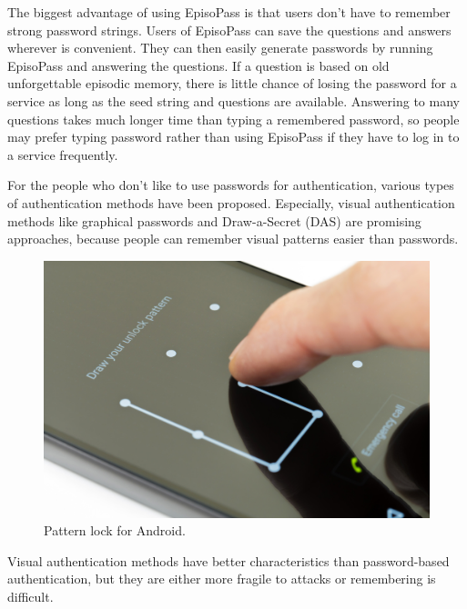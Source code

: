 \documentclass[sigconf]{acmart}
\begin{document}
The biggest advantage of using EpisoPass is that
users don't have to remember strong password strings.
%
Users of EpisoPass can save the questions and answers
wherever is convenient. They can
then easily generate passwords by running
EpisoPass and answering the questions.
%
If a question is based on old unforgettable episodic memory,
there is little chance of losing the password for a service
as long as the seed string and questions are available.
%
Answering to many questions takes much longer time than typing a
remembered password, so people may prefer typing password
rather than using EpisoPass if they have to log in to a service frequently.


For the people who don't like to use passwords for authentication,
various types of authentication methods have been proposed.
Especially, visual authentication methods
like graphical passwords\cite{Biddle:2012:GPL:2333112.2333114,GraphicalPasswords}
and Draw-a-Secret (DAS) \cite{DAS} are promising approaches, because
people can remember visual patterns easier than passwords.


\begin{figure}
  \includegraphics[width=12cm,bb=0 0 1000 667]{figures/AndroidLock.jpg}
  \caption{Pattern lock for Android.}
  \label{AndroidLock}
\end{figure}

Visual authentication methods have better characteristics than
password-based authentication, but
they are either more fragile to attacks
or remembering is difficult.
\end{document}
